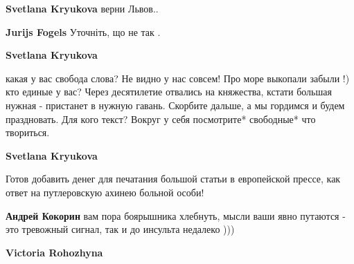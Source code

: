 \begin{itemize}
\begin{itemize}
\textbf{Svetlana Kryukova} верни Львов..

 
\textbf{Jurijs Fogels} Уточніть, що не так .

 
\textbf{Svetlana Kryukova} 

какая у вас свобода слова? Не видно у нас совсем!
Про море выкопали забыли !) кто единые у вас? Через десятилетие отвались на
княжества, кстати большая нужная - пристанет в нужную гавань. Скорбите дальше,
а мы гордимся и будем праздновать. Для кого текст? Вокруг у себя посмотрите*
свободные* что твориться.

 
\textbf{Svetlana Kryukova} 

Готов добавить денег для печатания большой статьи в европейской прессе, как
ответ на путлеровскую ахинею больной особи!

 
\textbf{Андрей Кокорин} вам пора боярышника хлебнуть, мысли ваши явно путаются - это тревожный сигнал, так и до инсульта недалеко )))

 
\textbf{Victoria Rohozhyna}

 

\end{itemize}
\end{itemize}
